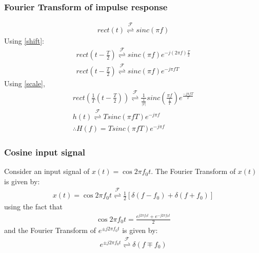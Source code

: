 \documentclass{beamer}
\providecommand{\sbrak}[1]{\ensuremath{{}\left[#1\right]}}
\providecommand{\brak}[1]{\ensuremath{\left(#1\right)}}
\providecommand{\fourier}{\overset{\mathcal{F}}{ \rightleftharpoons}}
\providecommand{\abs}[1]{\left\vert#1\right\vert}
\begin{document}
\begin{frame}
    \frametitle{Fourier Transform of impulse response}
    \begin{flushleft}
    \begin{align}
    rect(t) \fourier sinc(\pi f)
\end{align}
Using \eqref{shift}:
\begin{align}
    rect\brak{t - \frac{T}{2}} \fourier sinc(\pi f)e^{-j(2 \pi f)\frac{T}{2}}\\
    rect\brak{t - \frac{T}{2}} \fourier sinc(\pi f)e^{-j \pi f T}
\end{align}
Using \eqref{scale},
\begin{align}
    rect\brak{\frac{1}{T}\brak{t - \frac{T}{2}}} \fourier \frac{1}{\frac{1}{\abs{T}}}sinc\brak{\frac{\pi f }{\frac{1}{T}}}e^{\frac{-j \pi f T}{T}}\\
    h(t) \fourier Tsinc\brak{\pi f T}e^{-j\pi f}\\
    \therefore H(f)  = Tsinc\brak{\pi f T}e^{-j\pi f}
\end{align}
    \end{flushleft}
\end{frame}

\begin{frame}
\frametitle{Cosine input signal}    
\begin{flushleft}
Consider an input signal of $x(t) = \cos{2\pi f_0t}$. The Fourier Transform of $x(t)$ is given by:
\begin{align}
    x(t) = \cos{2\pi f_0t} \fourier \frac{1}{2}\sbrak{\delta(f - f_0) + \delta(f + f_0)}
\end{align}
using the fact that 
\begin{align}
    \cos{2\pi f_0 t} = \frac{e^{j2\pi f_0 t} + e^{-j2\pi f_0 t}}{2}
\end{align} and the Fourier Transform of $e^{\pm j2\pi f_0 t}$ is given by:
\begin{align}
    e^{\pm j2\pi  f_0 t} \fourier \delta(f \mp f_0)
    \label{FT}
\end{align}
\end{flushleft}
\end{frame}
\end{document}
